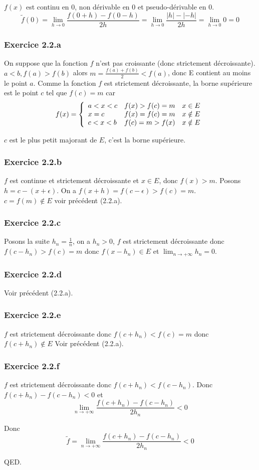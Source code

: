 \documentclass[]{book}
\theoremstyle{definition}
\begin{document}
$f(x)$ est continu en 0, non d\'erivable en 0 et pseudo-d\'erivable en 0.
$$\tilde{f}(0)= \lim_{h \to 0} \frac{f(0+h)-f(0-h)}{2h} = \lim_{h \to 0} \frac{|h|-|-h|}{2h} = \lim_{h \to 0} 0 = 0$$


\subsubsection*{Exercice 2.2.a}

On suppose que la fonction $f$ n'est pas croissante (donc strictement d\'ecroissante). 
$a<b, f(a) > f(b)$ alors $m = \frac{f(a)+f(b)}{2} < f(a)$, donc E contient au moins le point $a$. Comme la fonction $f$ est strictement d\'ecroissante, la borne sup\'erieure est le point $c$ tel que $f(c) = m$ car 
$$
f(x) = \left\{ 
\begin{array}{l l l}
a < x < c & f(x) > f(c) = m & x \in E \\
x = c & f(x) = f(c) = m & x \notin E \\
c < x < b & f(c) = m > f(x) & x \notin E \\
\end{array}
\right.
$$

$c$ est le plus petit majorant de $E$, c'est la borne sup\'erieure.

\subsubsection*{Exercice 2.2.b}
$f$ est continue et strictement d\'ecroissante et $x \in E$, donc $f(x) > m$. Posons $h = c-(x+\epsilon)$. On a $f(x+h) = f(c-\epsilon) > f(c) = m$. \\

$c = f(m) \notin E$ voir pr\'ec\'edent (2.2.a).

\subsubsection*{Exercice 2.2.c}
Posons la suite $h_n = \frac{1}{n}$, on a $h_n > 0$, $f$ est strictement d\'ecroissante donc $f(c-h_n) > f(c) = m$ donc $f(x-h_n) \in E$ et $\lim_{n \to +\infty} h_n = 0$.

\subsubsection*{Exercice 2.2.d}
Voir pr\'ec\'edent (2.2.a).

\subsubsection*{Exercice 2.2.e}
$f$ est strictement d\'ecroissante donc $f(c+h_n) < f(c) = m$ donc $f(c+h_n) \notin E$
Voir pr\'ec\'edent (2.2.a).

\subsubsection*{Exercice 2.2.f}
$f$ est strictement d\'ecroissante donc $f(c+h_n) < f(c-h_n)$. Donc $f(c+h_n)- f(c-h_n) < 0$ et 
$$\lim_{n \to +\infty} \frac{f(c+h_n)- f(c-h_n)}{2h_n} < 0$$

Donc
$$\tilde{f} = \lim_{n \to +\infty} \frac{f(c+h_n)- f(c-h_n)}{2h_n} < 0$$



QED.
\end{document}
